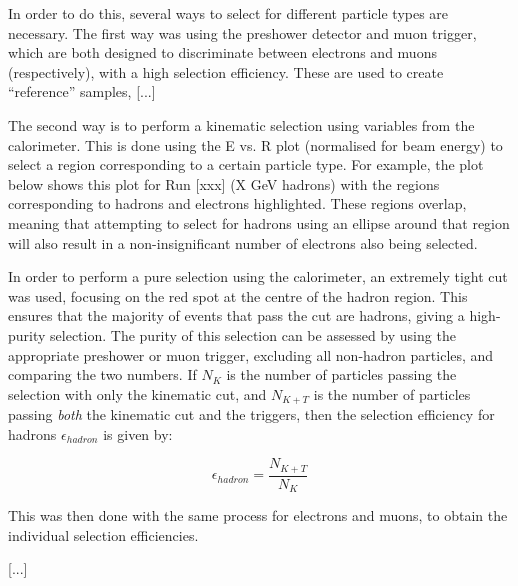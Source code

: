 In order to do this, several ways to select for different particle types are necessary. The first way was using the preshower detector and muon trigger, which are both designed to discriminate between electrons and muons (respectively), with a high selection efficiency. These are used to create ``reference'' samples, [...]

The second way is to perform a kinematic selection using variables from the calorimeter. This is done using the E vs. R plot (normalised for beam energy) to select a region corresponding to a certain particle type. For example, the plot below shows this plot for Run [xxx] (X GeV hadrons) with the regions corresponding to hadrons and electrons highlighted. These regions overlap, meaning that attempting to select for hadrons using an ellipse around that region will also result in a non-insignificant number of electrons also being selected.

In order to perform a pure selection using the calorimeter, an extremely tight cut was used, focusing on the red spot at the centre of the hadron region. This ensures that the majority of events that pass the cut are hadrons, giving a high-purity selection. The purity of this selection can be assessed by using the appropriate preshower or muon trigger, excluding all non-hadron particles, and comparing the two numbers. If $N_{K}$ is the number of particles passing the selection with only the kinematic cut, and $N_{K+T}$ is the number of particles passing \emph{both} the kinematic cut and the triggers, then the selection efficiency for hadrons $\epsilon_{hadron}$ is given by:

\begin{displaymath}
	\epsilon_{hadron} = \frac{N_{K+T}}{N_{K}}
\end{displaymath}

This was then done with the same process for electrons and muons, to obtain the individual selection efficiencies. %


[...]

